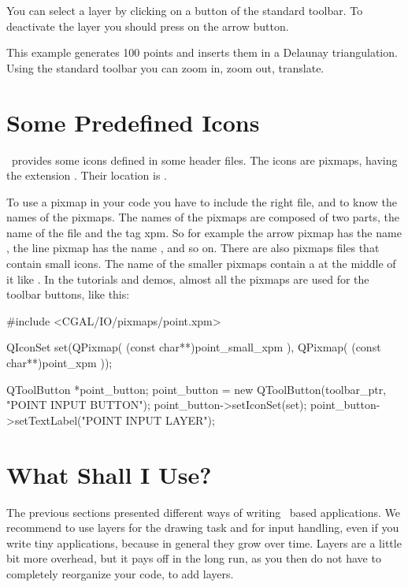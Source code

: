 You can select a layer by clicking on a button of the standard
toolbar. To deactivate the layer you should press on the arrow button.

\ccExample
{}

This example generates 100 points and inserts them in a Delaunay
triangulation. Using the standard toolbar you can zoom in, zoom out,
translate.

\section{Some Predefined Icons}
\label{The predefined icons}

\cgal\ provides some icons defined in some header files. The icons are
pixmaps, having the extension . Their location is .

To use a pixmap in your code you have to include the right file, and
to know the names of the pixmaps. The names of the pixmaps are
composed of two parts, the name of the file and the tag xpm. So for
example the arrow pixmap has the name , the line
pixmap has the name , and so on. There are also 
pixmaps files that contain small icons. The name of the smaller 
pixmaps contain a  at the middle of it like .
In the tutorials and demos, almost all the pixmaps are used for the 
toolbar buttons, like this:

\ccExample
\begin{ccExampleCode}
    
    #include <CGAL/IO/pixmaps/point.xpm>
    
    QIconSet set(QPixmap( (const char**)point_small_xpm ),
                  QPixmap( (const char**)point_xpm ));

    QToolButton *point_button;
    point_button = new QToolButton(toolbar_ptr, "POINT INPUT BUTTON");
    point_button->setIconSet(set);
    point_button->setTextLabel("POINT INPUT LAYER");

\end{ccExampleCode}



\section{What Shall I Use?}

The previous sections presented different ways of writing \qt\ based 
applications. We recommend to use layers for the drawing task and for
input handling, even if you write tiny applications, because in general
they grow over time. Layers are a little bit more overhead, but 
it pays off in the long run, as you then do not have to completely
reorganize your code, to add layers. 








